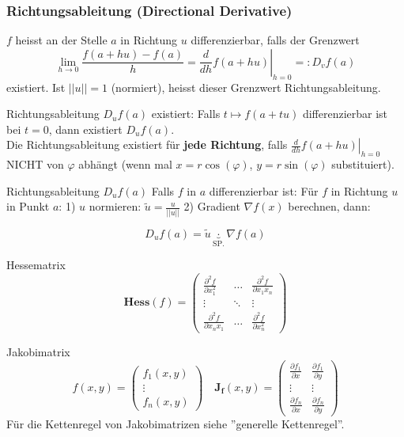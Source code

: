 \subsubsection{Richtungsableitung (Directional Derivative)}

$f$ heisst an der Stelle $a$ in Richtung $u$ differenzierbar, falls der Grenzwert 
	\[
		\lim_{h\to0}\frac{f(a + hu) -f(a)}{h} =
		\left.\frac{d}{dh}f(a+hu)\right|_{h = 0}
		=: D_vf(a)
	\]
existiert. Ist $||u|| = 1$ (normiert), heisst dieser Grenzwert Richtungsableitung.

\begin{Rezept}{Richtungsableitung $D_uf(a)$ existiert:}{} Falls $t \mapsto f(a + tu)$ differenzierbar ist bei $t=0$, dann existiert $D_uf(a)$.\\

	Die Richtungsableitung existiert für \textbf{jede Richtung}, falls $\left.\frac{d}{dh} f(a + hu) \right|_{h=0}$ NICHT von $\varphi$ abhängt (wenn mal $x=r\cos(\varphi)$, $y=r\sin(\varphi)$ substituiert).
\end{Rezept}

\begin{Rezept}{Richtungsableitung $D_u f(a)$}{}
Falls $f$ in $a$ differenzierbar ist: Für $f$ in Richtung $u$ in Punkt $a$: 1) $u$ normieren: $\tilde{u} = \frac{u}{||u||}$ 2) Gradient $\nabla f(x)$ berechnen, dann:

\[
    D_u f(a) = \tilde{u} \underbrace{\cdot}_{\text{SP.}} \nabla f(a)
\]
\end{Rezept}

\begin{Definition}{Hessematrix}{}
\[
    \mathbf{Hess}(f) =
        \begin{pmatrix}
            \frac{\partial^2 f}{\partial x_1^2}&\hdots&\frac{\partial^2 f}{\partial x_1 x_n}\\
            \vdots&\ddots&\vdots\\
            \frac{\partial^2 f}{\partial x_n x_1}&\hdots&\frac{\partial^2 f}{\partial x_n^2}
        \end{pmatrix}
\]
\end{Definition}

\begin{Definition}{Jakobimatrix}{}
\[
    f(x, y) =
        \begin{pmatrix}
            f_1(x, y)\\
            \vdots\\
            f_n(x, y)
        \end{pmatrix} \quad
    \mathbf{J_f}(x, y) =
        \begin{pmatrix}
                \frac{\partial f_1}{\partial x} & \frac{\partial f_1}{\partial y}\\
                \vdots&\vdots\\
            \frac{\partial f_n}{\partial x} & \frac{\partial f_n}{\partial y}
        \end{pmatrix}
\]
Für die Kettenregel von Jakobimatrizen siehe ''generelle Kettenregel''.
\end{Definition}

